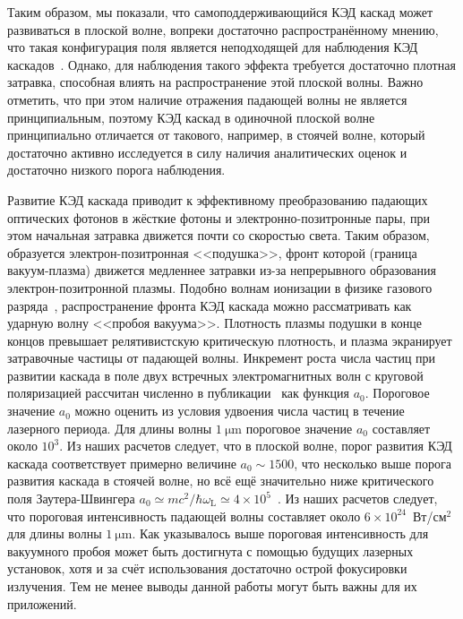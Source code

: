 Таким образом, мы показали, что самоподдерживающийся КЭД каскад может развиваться в плоской волне, вопреки достаточно распространённому мнению, что такая конфигурация поля является неподходящей для наблюдения КЭД каскадов~\cite{narozhny2015quantum,mironov2017observable,bulanov2013electromagnetic}.
Однако, для наблюдения такого эффекта требуется достаточно плотная затравка, способная влиять на распространение этой плоской волны.
Важно отметить, что при этом наличие отражения падающей волны не является принципиальным, поэтому КЭД каскад в одиночной плоской волне принципиально отличается от такового, например, в стоячей волне, который достаточно активно исследуется в силу наличия аналитических оценок и достаточно низкого порога наблюдения.

Развитие КЭД каскада приводит к эффективному преобразованию падающих оптических фотонов в жёсткие фотоны и электронно-позитронные пары, при этом начальная затравка движется почти со скоростью света.
Таким образом, образуется электрон-позитронная <<подушка>>, фронт которой (граница вакуум-плазма) движется медленнее затравки из-за непрерывного образования электрон-позитронной плазмы.
Подобно волнам ионизации в физике газового разряда~\cite{bollen1983high,semenov1982breakdown}, распространение фронта КЭД каскада можно рассматривать как ударную волну <<пробоя вакуума>>.
Плотность плазмы подушки в конце концов превышает релятивистскую критическую плотность, и плазма экранирует затравочные частицы от падающей волны.
Инкремент роста числа частиц при развитии каскада в поле двух встречных электромагнитных волн с круговой поляризацией рассчитан численно в публикации~\cite{grismayer2017seeded} как функция $a_0$.
Пороговое значение $a_0$ можно оценить из условия удвоения числа частиц в течение лазерного периода.
Для длины волны $\SI{1}{\um}$ пороговое значение $a_0$ составляет около $10^3$.
Из наших расчетов следует, что в плоской волне, порог развития КЭД каскада соответствует примерно величине $a_0 \sim 1500$, что несколько выше порога развития каскада в стоячей волне, но всё ещё значительно ниже критического поля Заутера-Швингера $a_0 \simeq m c^2/ \hbar \omega_\mathrm{L} \simeq 4 \times 10^5 $~\cite{Sauter31, Schwinger51}.
Из наших расчетов следует, что пороговая интенсивность падающей волны составляет около $6 \times 10^{24}$~Вт/см$^2$ для длины волны $\SI{1}{\um}$.
Как указывалось выше пороговая интенсивность для вакуумного пробоя может быть достигнута с помощью будущих лазерных установок, хотя и за счёт использования достаточно острой фокусировки излучения.
Тем не менее выводы данной работы могут быть важны для их приложений.
